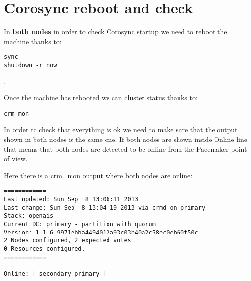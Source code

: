 \section {Corosync reboot and check}
In \textbf{both nodes} in order to check Corosync startup we need to reboot the machine thanks to:
\begin{verbatim}
sync
shutdown -r now
\end{verbatim}
.

Once the machine has rebooted we can cluster status thanks to:
\begin{verbatim}
crm_mon
\end{verbatim}

In order to check that everything is ok we need to make sure that the output shown in both nodes is the same one.
If both nodes are shown inside Online line that means that both nodes are detected to be online from the Pacemaker point of view.

Here there is a crm\_mon output where both nodes are online:
\begin{verbatim}
============
Last updated: Sun Sep  8 13:06:11 2013
Last change: Sun Sep  8 13:04:19 2013 via crmd on primary
Stack: openais
Current DC: primary - partition with quorum
Version: 1.1.6-9971ebba4494012a93c03b40a2c58ec0eb60f50c
2 Nodes configured, 2 expected votes
0 Resources configured.
============

Online: [ secondary primary ]
\end{verbatim}